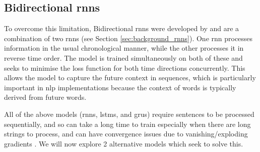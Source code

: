 \subsection{Bidirectional \acrlong{rnn}s}\label{sec:background_bidirectional_rnns}
To overcome this limitation, Bidirectional \acrshort{rnn}s were developed by \citet{Schuster} and are a combination of two \acrshort{rnn}s (see Section \ref{sec:background_rnns}). One \acrshort{rnn} processes information in the usual chronological manner, while the other processes it in reverse time order. The model is trained simultaneously on both of these and seeks to minimise the loss function for both time directions concurrently. This allows the model to capture the future context in sequences, which is particularly important in \acrshort{nlp} implementations because the context of words is typically derived from future words.

All of the above models (\acrshort{rnn}s, \acrshort{lstm}s, and \acrshort{gru}s) require sentences to be processed sequentially, and so can take a long time to train especially when there are long strings to process, and can have convergence issues due to vanishing/exploding gradients \citep{vaswani2017attention, Lipton}. We will now explore 2 alternative models which seek to solve this.




